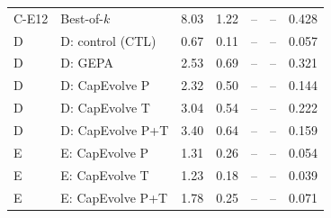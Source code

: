 \begin{table}[t]
\begin{tabular}{@{}llrrrrr@{}}
C-E12 & Best-of-$k$ & 8.03 & 1.22 & -- & -- & 0.428 \\
D & D: control (CTL) & 0.67 & 0.11 & -- & -- & 0.057 \\
D & D: GEPA & 2.53 & 0.69 & -- & -- & 0.321 \\
D & D: CapEvolve P & 2.32 & 0.50 & -- & -- & 0.144 \\
D & D: CapEvolve T & 3.04 & 0.54 & -- & -- & 0.222 \\
D & D: CapEvolve P+T & 3.40 & 0.64 & -- & -- & 0.159 \\
E & E: CapEvolve P & 1.31 & 0.26 & -- & -- & 0.054 \\
E & E: CapEvolve T & 1.23 & 0.18 & -- & -- & 0.039 \\
E & E: CapEvolve P+T & 1.78 & 0.25 & -- & -- & 0.071 \\
\bottomrule
\end{tabular}
\end{table}
